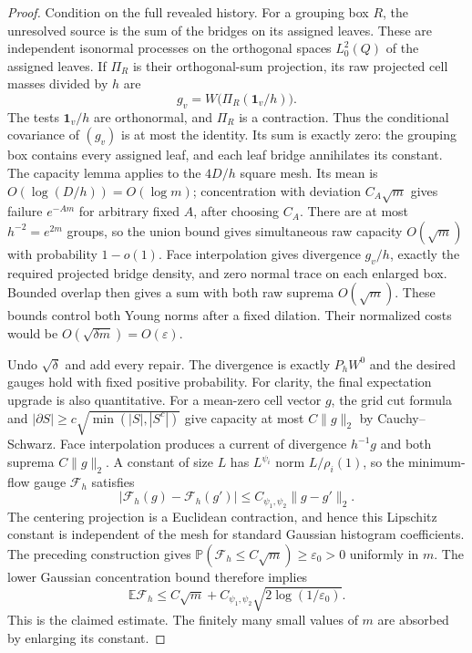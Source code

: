 \documentclass[11pt]{article}
\newcommand{\E}{\mathbb E}
\newcommand{\PP}{\mathbb P}
\numberwithin{equation}{section}
\begin{document}
\begin{proof}
Condition on the full revealed history. For a grouping box $R$,
the unresolved source is the sum of the bridges on its assigned
leaves. These are independent isonormal processes on the
orthogonal spaces $L^2_0(Q)$ of the assigned leaves. If
$\Pi_R$ is their orthogonal-sum projection, its raw projected
cell masses divided by $h$ are
\[
 g_v=W\bigl(\Pi_R(\mathbf1_v/h)\bigr).
\]
The tests $\mathbf1_v/h$ are orthonormal, and $\Pi_R$ is a
contraction. Thus the conditional covariance of $(g_v)$ is at
most the identity. Its sum is exactly zero: the grouping box
contains every assigned leaf, and each leaf bridge annihilates
its constant. The capacity lemma applies to the $4D/h$ square
mesh. Its mean is $O(\log(D/h))=O(\log m)$; concentration with
deviation $C_A\sqrt m$ gives failure $e^{-Am}$ for arbitrary
fixed $A$, after choosing $C_A$. There are at most $h^{-2}=e^{2m}$
groups, so the union bound gives simultaneous raw capacity
$O(\sqrt m)$ with probability $1-o(1)$. Face interpolation gives
divergence $g_v/h$, exactly the required projected bridge density,
and zero normal trace on each enlarged box. Bounded overlap
then gives a sum with both raw suprema $O(\sqrt m)$.
These bounds control both Young norms after a fixed dilation.
Their normalized costs would be $O(\sqrt{\delta m})=O(\varepsilon)$.

Undo $\sqrt\delta$ and add every repair. The divergence is exactly
$P_hW^0$ and the desired gauges hold with fixed positive probability.
For clarity, the final expectation upgrade is also quantitative.
For a mean-zero cell vector $g$, the grid cut formula and
$|\partial S|\ge c\sqrt{\min(|S|,|S^c|)}$ give capacity at most
$C\|g\|_2$ by Cauchy--Schwarz. Face interpolation produces a
current of divergence $h^{-1}g$ and both suprema $C\|g\|_2$.
A constant of size $L$ has $L^{\psi_i}$ norm
$L/\rho_i(1)$, so the minimum-flow gauge $\mathcal F_h$ satisfies
\[
 |\mathcal F_h(g)-\mathcal F_h(g')|
 \le C_{\psi_1,\psi_2}\|g-g'\|_2 .
\]
The centering projection is a Euclidean contraction, and hence
this Lipschitz constant is independent of the mesh for standard
Gaussian histogram coefficients. The preceding construction gives
$\PP(\mathcal F_h\le C\sqrt m)\ge\varepsilon_0>0$ uniformly in $m$.
The lower Gaussian concentration bound therefore implies
\[
 \E\mathcal F_h\le C\sqrt m+
 C_{\psi_1,\psi_2}\sqrt{2\log(1/\varepsilon_0)}.
\]
This is the claimed estimate. The finitely many small values of
$m$ are absorbed by enlarging its constant.
\end{proof}

\end{document}
